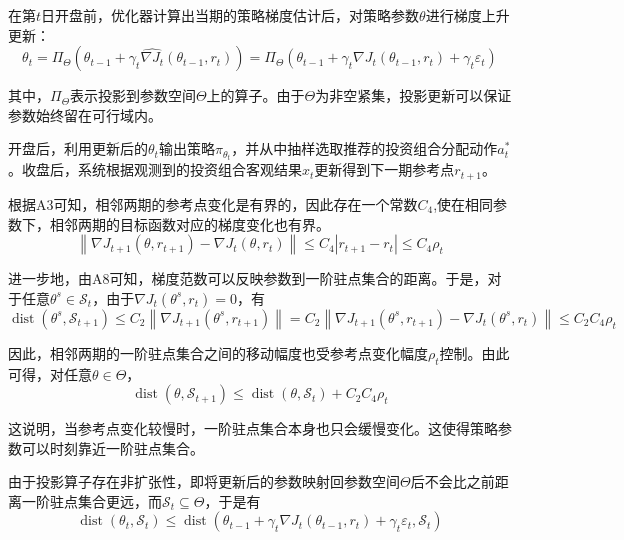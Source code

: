 在第$t$日开盘前，优化器计算出当期的策略梯度估计后，对策略参数$\theta$进行梯度上升更新：
\begin{equation}
\theta_t
=
\Pi_{\Theta}
\left(
\theta_{t-1}
+
\gamma_t
\widehat{\nabla J_t}(\theta_{t-1},r_t)
\right)
=
\Pi_{\Theta}
\left(
\theta_{t-1}
+
\gamma_t \nabla J_t(\theta_{t-1},r_t)
+
\gamma_t \varepsilon_t
\right)
\end{equation}

其中，$\Pi_{\Theta}$表示投影到参数空间$\Theta$上的算子。由于$\Theta$为非空紧集，投影更新可以保证参数始终留在可行域内。

开盘后，利用更新后的$\theta_t$输出策略$\pi_{\theta_t}$，并从中抽样选取推荐的投资组合分配动作$a_t^*$。收盘后，系统根据观测到的投资组合客观结果$x_t$更新得到下一期参考点$r_{t+1}$。

根据A3可知，相邻两期的参考点变化是有界的，因此存在一个常数$C_4$,使在相同参数下，相邻两期的目标函数对应的梯度变化也有界。
\begin{equation}
\left\|
\nabla J_{t+1}(\theta,r_{t+1})-\nabla J_t(\theta,r_t)
\right\|
\le
C_4
\left|
r_{t+1}-r_t
\right|
\le
C_4 \rho_t
\end{equation}

进一步地，由A8可知，梯度范数可以反映参数到一阶驻点集合的距离。于是，对于任意$\theta^s \in \mathcal S_t$，由于$\nabla J_t(\theta^s,r_t)=0$，有
\begin{equation}
\operatorname{dist}(\theta^s,\mathcal S_{t+1})
\le
C_2
\left\|
\nabla J_{t+1}(\theta^s,r_{t+1})
\right\|
=
C_2
\left\|
\nabla J_{t+1}(\theta^s,r_{t+1})-\nabla J_t(\theta^s,r_t)
\right\|
\le
C_2 C_4 \rho_t
\end{equation}

因此，相邻两期的一阶驻点集合之间的移动幅度也受参考点变化幅度$\rho_t$控制。由此可得，对任意$\theta \in \Theta$，
\begin{equation}
\operatorname{dist}(\theta,\mathcal S_{t+1})
\le
\operatorname{dist}(\theta,\mathcal S_t)
+
C_2 C_4 \rho_t
\end{equation}

这说明，当参考点变化较慢时，一阶驻点集合本身也只会缓慢变化。这使得策略参数可以时刻靠近一阶驻点集合。

由于投影算子存在非扩张性，即将更新后的参数映射回参数空间$\Theta$后不会比之前距离一阶驻点集合更远，而$\mathcal S_t \subseteq \Theta$，于是有
\begin{equation}
\operatorname{dist}(\theta_t,\mathcal S_t)
\le
\operatorname{dist}
\left(
\theta_{t-1}
+
\gamma_t \nabla J_t(\theta_{t-1},r_t)
+
\gamma_t \varepsilon_t,
\mathcal S_t
\right)
\end{equation}

